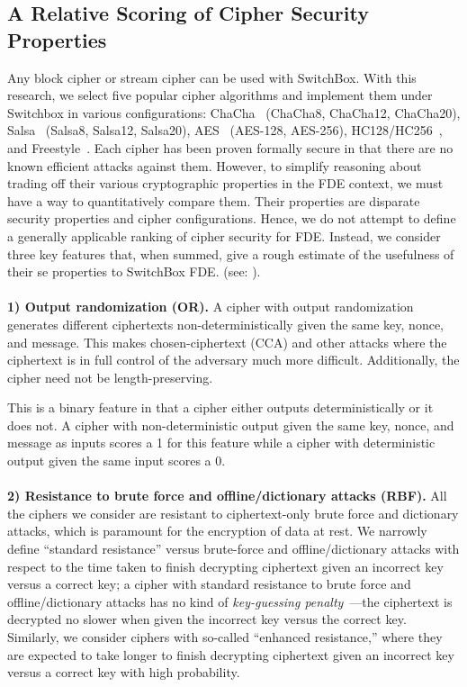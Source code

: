 \subsection{A Relative Scoring of Cipher Security Properties}


Any block cipher or stream cipher can be used with SwitchBox. With this
research, we select five popular cipher algorithms and implement them under
Switchbox in various configurations: ChaCha~\cite{ChaCha20} (ChaCha8, ChaCha12,
ChaCha20), Salsa~\cite{SalsaX} (Salsa8, Salsa12, Salsa20), AES~\cite{AES}
(AES-128, AES-256), HC128/HC256~\cite{HCX}, and Freestyle~\cite{Freestyle}. Each
cipher has been proven formally secure in that there are no known efficient
attacks against them. However, to simplify reasoning about trading off their
various cryptographic properties in the FDE context, we must have a way to
quantitatively compare them. Their properties are disparate security properties
and cipher configurations. Hence, we do not attempt to define a generally
applicable ranking of cipher security for FDE. Instead, we consider three key
features that, when summed, give a rough estimate of the usefulness of their
se properties to SwitchBox FDE. (see: ).\\
\\
\textbf{1) Output randomization (OR).} A cipher with output randomization
generates different ciphertexts non-deterministically given the same key, nonce,
and message. This makes chosen-ciphertext (CCA) and other attacks where the
ciphertext is in full control of the adversary much more difficult.
Additionally, the cipher need not be length-preserving.

This is a binary feature in that a cipher either outputs deterministically or
it does not. A cipher with non-deterministic output given the same key, nonce,
and message as inputs scores a 1 for this feature while a cipher with
deterministic output given the same input scores a 0.\\
\\
\textbf{2) Resistance to brute force and offline/dictionary attacks (RBF).}
All the ciphers we consider are resistant to ciphertext-only brute force and
dictionary attacks, which is paramount for the encryption of data at rest. We
narrowly define ``standard resistance'' versus brute-force and
offline/dictionary attacks with respect to the time taken to finish decrypting
ciphertext given an incorrect key versus a correct key; a cipher with standard
resistance to brute force and offline/dictionary attacks has no kind of
\emph{key-guessing penalty}~\cite{Freestyle}---the ciphertext is decrypted no
slower when given the incorrect key versus the correct key. Similarly, we
consider ciphers with so-called ``enhanced resistance,'' where they are expected
to take longer to finish decrypting ciphertext given an incorrect key versus a
correct key with high probability.

